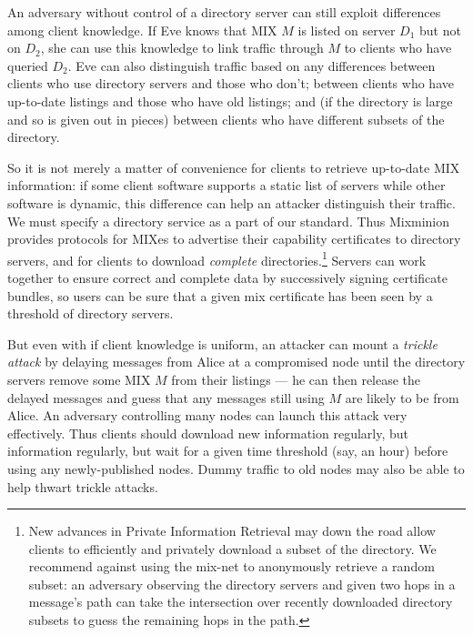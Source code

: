 \documentclass{llncs}
\begin{document}
An adversary without control of a directory server can still exploit
differences among client knowledge. If Eve knows that MIX $M$ is listed
on server $D_1$ but not on $D_2$, she can use this knowledge to link
traffic through $M$ to clients who have queried $D_2$.  Eve can also
distinguish traffic based on any differences between clients who use
directory servers and those who don't; between clients who have up-to-date
listings and those who have old listings; and (if the directory is large
and so is given out in pieces) between clients who have different subsets
of the directory.

So it is not merely a matter of convenience for clients to retrieve
up-to-date MIX information: if some client software supports a static
list of servers while other software is dynamic, this difference can
help an attacker distinguish their traffic. We must specify a directory
service as a part of our standard. Thus Mixminion provides protocols for
MIXes to advertise their capability certificates to directory servers,
and for clients to download \emph{complete} directories.\footnote{
  New advances in Private Information Retrieval \cite{malkin-thesis} may down the
  road allow clients to efficiently and privately download a subset of
  the directory. We recommend against using the mix-net to anonymously
  retrieve a random subset: an adversary observing the directory servers
  and given two hops in a message's path can take the intersection over
  recently downloaded directory subsets to guess the remaining hops in
  the path.}
Servers can work together to ensure correct and complete data by
successively signing certificate bundles, so users can be sure that a
given mix certificate has been seen by a threshold of directory servers.

But even with if client knowledge is uniform, an attacker can mount a
\emph{trickle attack} by delaying messages from Alice at a compromised
node until the directory servers remove some MIX $M$ from their listings
--- he can then release the delayed messages and guess that any messages
still using $M$ are likely to be from Alice. An adversary controlling
many nodes can launch this attack very effectively. Thus clients
should download new information regularly, but information regularly,
but wait for a given time threshold (say, an hour) before using any
newly-published nodes. Dummy traffic to old nodes may also be able to
help thwart trickle attacks.
\end{document}
